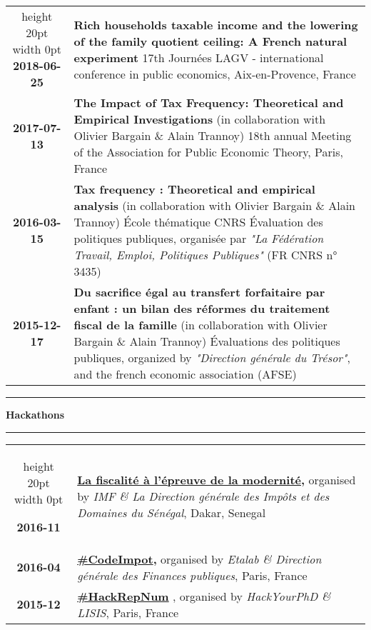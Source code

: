 \documentclass[a4paper,11pt]{article} %
\newcommand\espace{\vrule height 20pt width 0pt}
\newcommand{\titre}[1]{%
	\begin{center}
	\rule{\textwidth}{1pt}
	\par\vspace{0.1cm}
        \textbf{\large #1}
	\par\rule{\textwidth}{1pt}
	\end{center}
	}
\begin{document}
\begin{tabular}{c@{ :  }p{}}
\espace
\textbf{2018-06-25} & \textbf{Rich households taxable income and the lowering of the family quotient ceiling: A French natural experiment}
17th Journées LAGV - international conference in public economics, Aix-en-Provence, France \\
\textbf{2017-07-13} & \textbf{ The Impact of Tax Frequency: Theoretical and Empirical Investigations} (in collaboration with Olivier Bargain \& Alain Trannoy) 
18th annual Meeting of the Association for Public Economic Theory, Paris, France \\
\textbf{2016-03-15} & \textbf{ Tax frequency : Theoretical and empirical analysis} (in collaboration with Olivier Bargain \& Alain Trannoy)  École thématique CNRS Évaluation des politiques publiques, organisée par \emph{"La Fédération Travail, Emploi, Politiques Publiques"} (FR CNRS n° 3435) \\
\textbf{2015-12-17} & \textbf{ Du sacrifice égal au transfert forfaitaire par enfant : un bilan des réformes du traitement fiscal de la famille} (in collaboration with Olivier Bargain \& Alain Trannoy)  Évaluations des politiques publiques, organized by \emph{"Direction générale du Trésor"}, and the french economic association (AFSE) \\
\end{tabular}


\titre{Hackathons}

\begin{tabular}{c@{ :  }p{}}
\espace



\textbf{2016-11} & \textbf{
\href{https://www.etalab.gouv.fr/openfisca-au-hackathon-sur-la-fiscalite-de-dakar}{La fiscalité à l'épreuve de la modernité},} organised by \emph{IMF \& La Direction générale des Impôts et des Domaines du Sénégal}, Dakar, Senegal \\
\textbf{2016-04} & \textbf{
\href{https://www.etalab.gouv.fr/codeimpot-un-hackathon-autour-de-louverture-du-code-source-du-calculateur-impots}{ \#CodeImpot},} organised by \emph{Etalab \& Direction générale des Finances publiques}, Paris, France \\
\textbf{2015-12} & \textbf{ 
\href{https://www.data.gouv.fr/en/reuses/hackrepnum-un-hackathon-recherche-autour-de-la-loi-sur-le-numerique/}
{\#HackRepNum}} , organised by \emph{HackYourPhD \& LISIS}, Paris, France \\


\end{tabular}
\newpage
\end{document}
